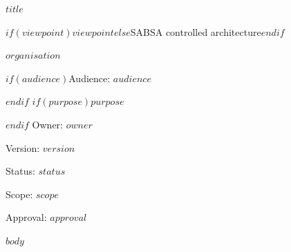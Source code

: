 \documentclass[11pt,a4paper]{article}
\begin{document}
\begin{titlepage}
\vspace*{25mm}
{\Huge\bfseries $title$\par}
\vspace{12mm}
{\Large $if(viewpoint)$$viewpoint$$else$SABSA controlled architecture$endif$\par}
\vspace{6mm}
$organisation$\par
$if(audience)$Audience: $audience$\par$endif$
$if(purpose)$\vspace{5mm}$purpose$\par$endif$
\vfill
Owner: $owner$\par
Version: $version$\par
Status: $status$\par
Scope: $scope$\par
Approval: $approval$\par
\end{titlepage}
\tableofcontents
\newpage
$body$
\end{document}

